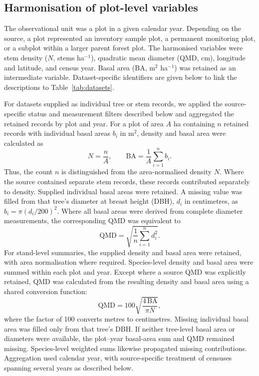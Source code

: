 \documentclass{myreport}
\begin{document}
\subsection{Harmonisation of plot-level variables}
\label{sec:harmonisation}

The observational unit was a plot in a given calendar year. Depending on the source, a plot represented an inventory sample plot, a permanent monitoring plot, or a subplot within a larger parent forest plot. The harmonised variables were stem density ($N$, stems ha$^{-1}$), quadratic mean diameter (QMD, cm), longitude and latitude, and census year. Basal area (BA, m$^2$ ha$^{-1}$) was retained as an intermediate variable. Dataset-specific identifiers are given below to link the descriptions to Table~\ref{tab:datasets}.

For datasets supplied as individual tree or stem records, we applied the source-specific status and measurement filters described below and aggregated the retained records by plot and year. For a plot of area $A$ ha containing $n$ retained records with individual basal areas $b_i$ in m$^2$, density and basal area were calculated as
\begin{equation}
N = \frac{n}{A}, \qquad
\mathrm{BA} = \frac{1}{A}\sum_{i=1}^{n}b_i.
\label{eq:ba}
\end{equation}
Thus, the count $n$ is distinguished from the area-normalised density $N$. Where the source contained separate stem records, these records contributed separately to density. Supplied individual basal areas were retained. A missing value was filled from that tree's diameter at breast height (DBH), $d_i$ in centimetres, as $b_i = \pi(d_i/200)^2$. Where all basal areas were derived from complete diameter measurements, the corresponding QMD was equivalent to
\begin{equation}
\mathrm{QMD} = \sqrt{\frac{1}{n}\sum_{i=1}^{n}d_i^2}.
\label{eq:qmd}
\end{equation}
For stand-level summaries, the supplied density and basal area were retained, with area normalisation where required. Species-level density and basal area were summed within each plot and year. Except where a source QMD was explicitly retained, QMD was calculated from the resulting density and basal area using a shared conversion function:
\begin{equation}
\mathrm{QMD} = 100\sqrt{\frac{4\,\mathrm{BA}}{\pi N}},
\label{eq:qmd2}
\end{equation}
where the factor of 100 converts metres to centimetres. Missing individual basal area was filled only from that tree's DBH. If neither tree-level basal area or diameters were available, the plot--year basal-area sum and QMD remained missing. Species-level weighted sums likewise propagated missing contributions. Aggregation used calendar year, with source-specific treatment of censuses spanning several years as described below.
\end{document}
